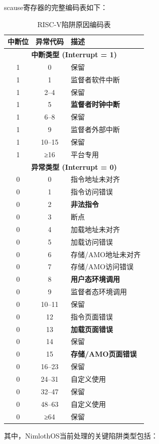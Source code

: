 scause寄存器的完整编码表如下：

\begin{table}[!htbp]
\centering
\caption{RISC-V陷阱原因编码表}
\label{tab:trap-causes}
\begin{tabular}{|c|c|l|}
\hline
\textbf{中断位} & \textbf{异常代码} & \textbf{描述} \\
\hline
\multicolumn{3}{|c|}{\textbf{中断类型 (Interrupt = 1)}} \\
\hline
1 & 0 & 保留 \\
1 & 1 & 监督者软件中断 \\
1 & 2–4 & 保留 \\
1 & 5 & \textbf{监督者时钟中断} \\
1 & 6–8 & 保留 \\
1 & 9 & 监督者外部中断 \\
1 & 10–15 & 保留 \\
1 & ≥16 & 平台专用 \\
\hline
\multicolumn{3}{|c|}{\textbf{异常类型 (Interrupt = 0)}} \\
\hline
0 & 0 & 指令地址未对齐 \\
0 & 1 & 指令访问错误 \\
0 & 2 & \textbf{非法指令} \\
0 & 3 & 断点 \\
0 & 4 & 加载地址未对齐 \\
0 & 5 & 加载访问错误 \\
0 & 6 & 存储/AMO地址未对齐 \\
0 & 7 & 存储/AMO访问错误 \\
0 & 8 & \textbf{用户态环境调用} \\
0 & 9 & 监督者态环境调用 \\
0 & 10–11 & 保留 \\
0 & 12 & 指令页面错误 \\
0 & 13 & \textbf{加载页面错误} \\
0 & 14 & 保留 \\
0 & 15 & \textbf{存储/AMO页面错误} \\
0 & 16–23 & 保留 \\
0 & 24–31 & 自定义使用 \\
0 & 32–47 & 保留 \\
0 & 48–63 & 自定义使用 \\
0 & ≥64 & 保留 \\
\hline
\end{tabular}
\end{table}

其中，NimlothOS当前处理的关键陷阱类型包括：

